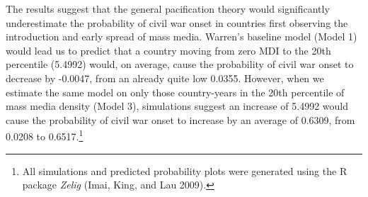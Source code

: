 \documentclass[11pt,article,oneside]{memoir}
\begin{document}
The results suggest that the general pacification theory would
significantly underestimate the probability of civil war onset in
countries first observing the introduction and early spread of mass
media. Warren's baseline model (Model 1) would lead us to predict that a
country moving from zero MDI to the 20th percentile (5.4992) would, on
average, cause the probability of civil war onset to decrease by
-0.0047, from an already quite low 0.0355. However, when we estimate the
same model on only those country-years in the 20th percentile of mass
media density (Model 3), simulations suggest an increase of 5.4992 would
cause the probability of civil war onset to increase by an average of
0.6309, from 0.0208 to 0.6517.\footnote{All simulations and predicted
  probability plots were generated using the R package \emph{Zelig}
  (Imai, King, and Lau 2009).}
\end{document}

